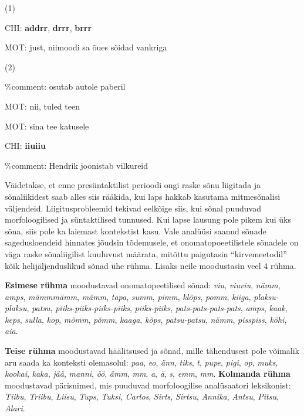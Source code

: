 \documentclass[12pt]{article}
\begin{document}
(1)
\begin{description}
    \item *CHI: \textbf{addrr}, \textbf{drrr}, \textbf{brrr}
    \item *MOT: just, niimoodi sa õues sõidad vankriga \citep[27]{IMITATIIV}
\end{description}

(2)

\%comment: osutab autole paberil
\begin{description}
    \item *MOT: nii, tuled teen
    \item *MOT: sina tee katusele
    \item *CHI: \textbf{iiuiiu}
\end{description}
\%comment: Hendrik joonistab vilkureid \citep[28]{IMITATIIV}

Väidetakse, et enne presüntaktilist perioodi ongi raske sõnu liigitada ja sõnaliikidest saab alles siis rääkida, kui laps hakkab kasutama mitmesõnalisi väljendeid. Liigitusprobleemid tekivad eelkõige siis, kui sõnal puuduvad morfoloogilised ja süntaktilised tunnused. Kui lapse lausung pole pikem kui üks sõna, siis pole ka laiemast kontekstist kasu. \citep[27--29]{IMITATIIV} Vale analüüsi saanud sõnade sagedusloendeid hinnates jõudsin tõdemusele, et onomatopoeetilistele sõnadele on väga raske sõnaliigilist kuuluvust määrata, mitõttu paigutasin ``kirvemeetodil'' kõik helijäljenduslikud sõnad ühe rühma. Lisaks neile moodustasin veel 4 rühma.

\textbf{Esimese rühma} moodustavad onomatopeetilised sõnad: \emph{viu}, \emph{viuviu}, \emph{nämm}, \emph{amps}, \emph{mämmmämm}, \emph{mämm}, \emph{tapa}, \emph{summ}, \emph{pimm}, \emph{klõps}, \emph{pomm}, \emph{kiiga}, \emph{plaksu-plaksu}, \emph{patsu}, \emph{piiks-piiks-piiks-piiks}, \emph{piiks-piiks}, \emph{pats-pats-pats-pats}, \emph{amps}, \emph{kaak}, \emph{keps}, \emph{sulla}, \emph{kop}, \emph{mõmm}, \emph{põmm}, \emph{kaaga}, \emph{kõps}, \emph{patsu-patsu}, \emph{nämm}, \emph{pisspiss}, \emph{köhi}, \emph{aia}. 


\textbf{Teise rühma} moodustavad häälitsused ja sõnad, mille tähendusest pole võimalik aru saada ka konteksti olemasolul: \emph{paa}, \emph{eo}, \emph{änn}, \emph{tiks}, \emph{t}, \emph{pupe}, \emph{pigi}, \emph{op}, \emph{muks}, \emph{kookai}, \emph{kaka}, \emph{jää}, \emph{manni}, \emph{öö}, \emph{ämm}, \emph{mm}, \emph{a}, \emph{ä}, \emph{s}, \emph{emm}, \emph{mm}. \textbf{Kolmanda rühma} moodustavad pärisnimed, mis puuduvad morfoloogilise analüsaatori leksikonist: \emph{Tiibu}, \emph{Triibu}, \emph{Liisu}, \emph{Tups}, \emph{Tuksi}, \emph{Carlos}, \emph{Sirts}, \emph{Sirtsu}, \emph{Annika}, \emph{Antsu}, \emph{Pitsu}, \emph{Alari}.
\end{document}
